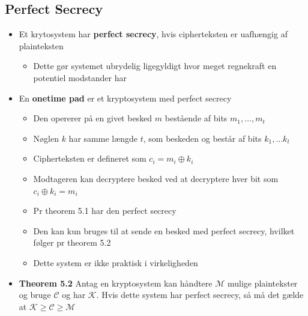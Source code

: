 \documentclass[a4, english]{article}
\begin{document}
\subsection{Perfect Secrecy}
\begin{itemize}
	\item Et krytosystem har \textbf{perfect secrecy}, hvis cipherteksten er uafhængig af plainteksten
  \begin{itemize}
  	\item Dette gør systemet ubrydelig ligegyldigt hvor meget regnekraft en potentiel modstander har 
  \end{itemize}
  \item En \textbf{onetime pad} er et kryptosystem med perfect secrecy
  \begin{itemize}
  	\item Den opererer på en givet besked $m$ bestående af bits $m_1, \dots, m_t$ 
    \item Nøglen $k$ har samme længde $t$, som beskeden og består af bits $k_1, \dots k_t$ 
    \item Cipherteksten er defineret som $c_i = m_i \oplus k_i$ 
    \item Modtageren kan decryptere besked ved at decryptere hver bit som $c_i \oplus k_i = m_i$
    \item Pr theorem 5.1 har den perfect secrecy
    \item Den kan kun bruges til at sende en besked med perfect secrecy, hvilket følger pr theorem 5.2
    \item Dette system er ikke praktisk i virkeligheden 
  \end{itemize}
  \item \textbf{Theorem 5.2} Antag en kryptosystem kan håndtere $\mathcal M$ mulige plaintekster og bruge $\mathcal C$ og har $\mathcal K$. Hvis dette system har perfect secrecy, så må det gælde at $\mathcal K \geq \mathcal C \geq \mathcal M$ 
\end{itemize}
\end{document}
